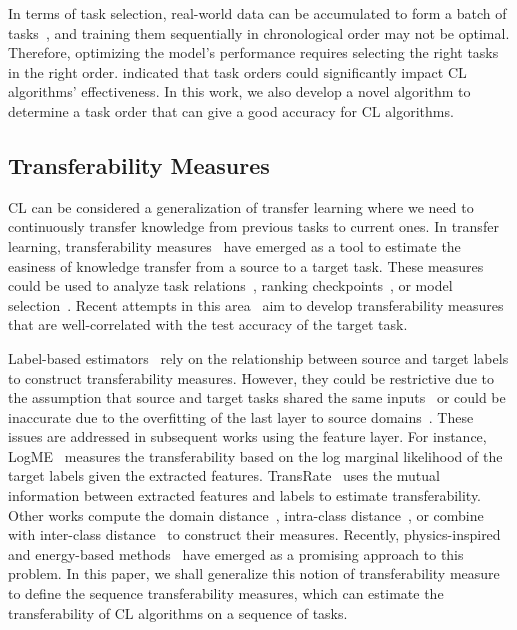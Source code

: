 In terms of task selection, real-world data can be accumulated to form a batch of tasks~\citep{caccia2022anytime}, and training them sequentially in chronological order may not be optimal. Therefore, optimizing the model's performance requires selecting the right tasks in the right order. \cite{bell2022effect} indicated that task orders could significantly impact CL algorithms' effectiveness. In this work, we also develop a novel algorithm to determine a task order that can give a good accuracy for CL algorithms.


\subsection{Transferability Measures}

CL can be considered a generalization of transfer learning where we need to continuously transfer knowledge from previous tasks to current ones. In transfer learning, transferability measures~\citep{nguyen2020leep, you2021logme, yang2023pick} have emerged as a tool to estimate the easiness of knowledge transfer from a source to a target task. These measures could be used to analyze task relations~\citep{achille2019task2vec}, ranking checkpoints~\citep{li2021ranking}, or model selection~\citep{you2021logme}. Recent attempts in this area~\citep{tran2019transferability, nguyen2020leep, you2021logme, li2023exploring} aim to develop transferability measures that are well-correlated with the test accuracy of the target task. 

Label-based estimators~\citep{tran2019transferability, nguyen2020leep} rely on the relationship between source and target labels to construct transferability measures. However, they could be restrictive due to the assumption that source and target tasks shared the same inputs~\citep{tran2019transferability} or could be inaccurate due to the overfitting of the last layer to source domains~\citep{nguyen2020leep}. These issues are addressed in subsequent works using the feature layer. For instance, LogME~\citep{you2021logme} measures the transferability based on the log marginal likelihood of the target labels given the extracted features. TransRate~\citep{huang2022frustratingly} uses the mutual information between extracted features and labels to estimate transferability. Other works compute the domain distance~\citep{tan2021otce}, intra-class distance~\citep{xu2023fast}, or combine with inter-class distance~\citep{bao2019information, pandy2022transferability} to construct their measures. Recently, physics-inspired and energy-based methods~\citep{gholami2023etran, li2023exploring} have emerged as a promising approach to this problem. In this paper, we shall generalize this notion of transferability measure to define the sequence transferability measures, which can estimate the transferability of CL algorithms on a sequence of tasks.